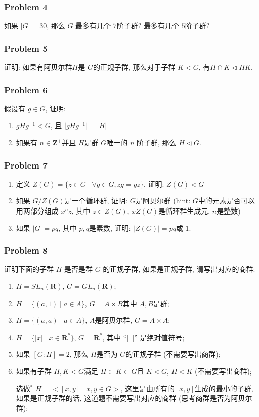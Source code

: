 \documentclass[a4paper,12pt]{ctexart}
\newcommand{\Z}{\mathbf{Z}}
\newcommand{\R}{\mathbf{R}}
\begin{document}
\subsubsection*{Problem 4}
    如果 $ \lvert G\rvert=30 $, 那么 $ G $ 最多有几个 $ 7 $阶子群? 最多有几个 $ 5 $阶子群?
    
\subsubsection*{Problem 5}
    证明: 如果有阿贝尔群$ H $是 $ G $的正规子群, 那么对于子群 $ K<G $, 有$ H\cap K\triangleleft HK $.

\subsubsection*{Problem 6}
    假设有 $ g\in G $, 证明:
    \begin{enumerate}
      \item $ gHg^{-1}<G $, 且 $ \lvert gHg^{-1}\rvert=\lvert H\rvert $
      \item 如果有 $ n\in\Z^+ $并且 $ H $是群 $ G $唯一的 $ n $ 阶子群, 那么 $ H \triangleleft G$.
    \end{enumerate}
\subsubsection*{Problem 7}
    \begin{enumerate}
      \item 定义 $ Z(G)=\{z\in G\mid \forall g\in G, zg=gz\} $, 证明: $ Z(G)\triangleleft G $
      \item 如果 $ G/Z(G) $是一个循环群, 证明: $ G $是阿贝尔群 (hint: $ G $中的元素是否可以用两部分组成 $ x^nz $, 其中 $ z\in Z(G) $, $ xZ(G) $是循环群生成元, $ n $是整数)
      \item 如果 $ \lvert G\rvert=pq $, 其中 $ p,q $是素数, 证明: $ \lvert Z(G)\rvert=pq $或 $ 1 $.
    \end{enumerate}
    \subsubsection*{Problem 8}
    证明下面的子群 $ H $ 是否是群 $ G $ 的正规子群, 如果是正规子群, 请写出对应的商群:
    \begin{enumerate}
      \item $ H=SL_n(\R) $, $ G=GL_n(\R) $;
      \item $ H=\{(a,1)\mid a\in A\} $, $ G=A\times B $其中 $ A,B $是群;
      \item $ H=\{(a,a)\mid a\in A\} $, $ A $是阿贝尔群, $ G=A\times A $;
      \item $ H=\{|x|\mid x\in \R^*\} $, $ G=\R^* $, 其中  ``|~|'' 是绝对值符号;
      \item 如果 $ [G:H]=2 $, 那么 $ H $是否为 $ G $的正规子群 (不需要写出商群);
      \item 如果有子群 $ H,K<G $满足 $ H\subset K\subset G $且 $ K\triangleleft G $, $ H\triangleleft K $ (不需要写出商群);
      \item[选做$^*$] $ H=<[x,y]\mid x,y\in G> $, 这里是由所有的$ [x,y] $生成的最小的子群, 如果是正规子群的话, 这道题不需要写出对应的商群 (思考商群是否为阿贝尔群);
    \end{enumerate}
\end{document}

